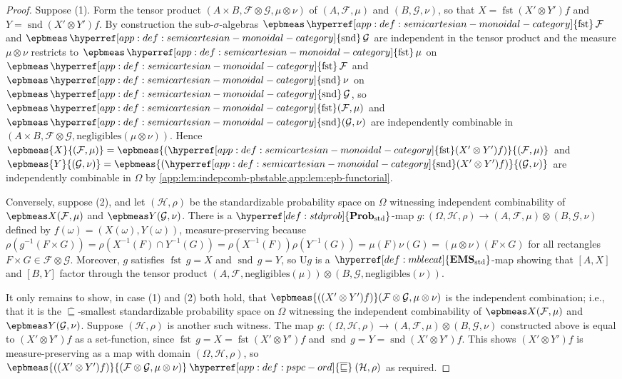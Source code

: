 \documentclass[
  sigconf,
  screen, ]{acmart}
\theoremstyle{definition}
\newcommand\calF{\mathcal F}
\newcommand\calG{\mathcal G}
\newcommand\calH{\mathcal H}
\newcommand\nref[2]{\hyperref[#1]{#2}} \newcommand\checkhigh{{\huge{\color{red}\textbf{TODO: check}}}}
\newcommand\scmfst{\mathop{\nref{app:def:semicartesian-monoidal-category}{\mathrm{fst}}}}
\newcommand\scmsnd{\mathop{\nref{app:def:semicartesian-monoidal-category}{\mathrm{snd}}}}
\newcommand\negligibles{\mathrm{negligibles}}
\newcommand\texforgetmu{\mathrm{U}}
\newcommand\forgetmu{{\nref{def:forgetmu}{\texforgetmu}}}
\newcommand\texStdProb{\mathbf{Prob}_{\rm std}}
\newcommand\StdProb{{\nref{def:stdprob}{\texStdProb}}}
\newcommand\texStdMble{\mathbf{EMS}_{\rm std}}
\newcommand\StdMble{{\nref{def:mblecat}{\texStdMble}}}
\newcommand\gkrmorder{\mathbin{\nref{app:def:pspc-ord}{\overline{\sqsubseteq}}}}
\begin{document}
\begin{proof}
  Suppose (1).
  Form the tensor product $(A\times B,\calF\otimes\calG,\mu\otimes\nu)$
  of $(A,\calF,\mu)$ and $(B,\calG,\nu)$,
  so that $X = \scmfst(X'\otimes Y')f$
  and $Y=\scmsnd(X'\otimes Y')f$.
  By construction the sub-$\sigma$-algebras $\epbmeas\scmfst\calF$
  and $\epbmeas\scmsnd\calG$ are independent
  in the tensor product and the measure $\mu\otimes\nu$
  restricts to $\epbmeas\scmfst\mu$ on $\epbmeas\scmfst\calF$
  and $\epbmeas\scmsnd\nu$ on $\epbmeas\scmsnd\calG$,
  so $\epbmeas\scmfst(\calF,\mu)$ and $\epbmeas\scmsnd(\calG,\nu)$
  are independently combinable in $(A\times B,\calF\otimes\calG,\negligibles(\mu\otimes\nu))$.
  Hence $\epbmeas{X}{(\calF,\mu)}=\epbmeas{(\scmfst(X'\otimes Y')f)}{(\calF,\mu)}$
     and $\epbmeas{Y}{(\calG,\nu)}=\epbmeas{(\scmsnd(X'\otimes Y')f)}{(\calG,\nu)}$
     are independently combinable in $\Omega$
     by \cref{app:lem:indepcomb-pbstable,app:lem:epb-functorial}.

   Conversely, suppose (2),
   and let $(\calH,\rho)$ be the standardizable probability space
   on $\Omega$ witnessing independent combinability
   of $\epbmeas X{(\calF,\mu)}$
   and $\epbmeas Y{(\calG,\nu)}$.
   There is a $\StdProb$-map
   $g : (\Omega,\calH,\rho)\to(A,\calF,\mu)\otimes(B,\calG,\nu)$
   defined by $f(\omega)=(X(\omega),Y(\omega))$,
   measure-preserving because $\rho(g^{-1}(F\times G))
   = \rho(X^{-1}(F)\cap Y^{-1}(G))
   = \rho(X^{-1}(F))\rho(Y^{-1}(G))
   = \mu(F)\nu(G) = (\mu\otimes\nu)(F\times G)$
   for all rectangles $F\times G\in\calF\otimes\calG$.
   Moreover, $g$ satisfies $\scmfst\,g = X$ and $\scmsnd\,g = Y$,
   so $\forgetmu g$ is a $\StdMble$-map
   showing that $[A,X]$ and $[B,Y]$ factor through the tensor product
   $(A,\calF,\negligibles(\mu))\otimes(B,\calG,\negligibles(\nu))$.

   It only remains to show, in case (1) and (2) both hold,
   that $\epbmeas{((X'\otimes Y')f)}(\calF\otimes\calG,\mu\otimes\nu)$
   is the independent combination; i.e.,
   that it is the $\gkrmorder$-smallest standardizable probability space on $\Omega$
   witnessing the independent combinability
   of $\epbmeas X{(\calF,\mu)}$
   and $\epbmeas Y{(\calG,\nu)}$.
   Suppose $(\calH,\rho)$ is another such witness.
   The map $g : (\Omega,\calH,\rho)\to(A,\calF,\mu)\otimes(B,\calG,\nu)$
   constructed above
   is equal to $(X'\otimes Y')f$
   as a set-function,
   since $\scmfst\,g = X = \scmfst(X'\otimes Y')f$
   and $\scmsnd\,g = Y = \scmsnd(X'\otimes Y')f$.
   This shows $(X'\otimes Y')f$ is measure-preserving
   as a map with domain $(\Omega,\calH,\rho)$,
   so
   $\epbmeas{((X'\otimes Y')f)}{(\calF\otimes\calG,\mu\otimes\nu)}
   \gkrmorder (\calH,\rho)$ as required.
\end{proof}
\end{document}
